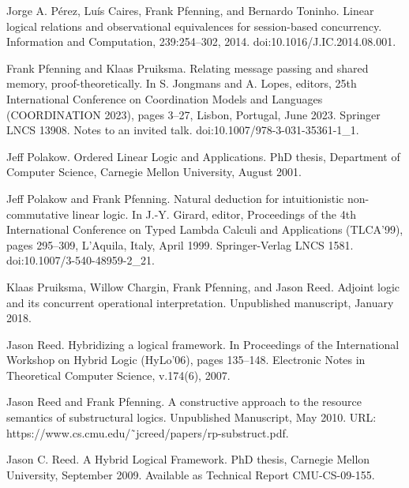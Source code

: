 \par\noindent  [34]  Jorge A. Pérez, Luís Caires, Frank Pfenning, and Bernardo Toninho.  Linear logical relations and observational equivalences for session-based concurrency.  Information and Computation, 239:254–302, 2014.  doi:10.1016/J.IC.2014.08.001.  
 
\par\noindent  [35]  Frank Pfenning and Klaas Pruiksma.  Relating message passing and shared memory, proof-theoretically.  In S. Jongmans and A. Lopes, editors, 25th International Conference on Coordination Models and Languages (COORDINATION 2023), pages 3–27, Lisbon, Portugal, June 2023. Springer LNCS 13908.  Notes to an invited talk.  doi:10.1007/978-3-031-35361-1\_1.  
 
\par\noindent  [36]  Jeff Polakow.  Ordered Linear Logic and Applications.  PhD thesis, Department of Computer Science, Carnegie Mellon University, August 2001.  
 
\par\noindent  [37]  Jeff Polakow and Frank Pfenning.  Natural deduction for intuitionistic non-commutative linear logic.  In J.-Y. Girard, editor, Proceedings of the 4th International Conference on Typed Lambda Calculi and Applications (TLCA’99), pages 295–309, L’Aquila, Italy, April 1999. Springer-Verlag LNCS 1581.  doi:10.1007/3-540-48959-2\_21.  
 
\par\noindent  [38]  Klaas Pruiksma, Willow Chargin, Frank Pfenning, and Jason Reed.  Adjoint logic and its concurrent operational interpretation.  Unpublished manuscript, January 2018.  
 
\par\noindent  [39]  Jason Reed.  Hybridizing a logical framework.  In Proceedings of the International Workshop on Hybrid Logic (HyLo’06), pages 135–148. Electronic Notes in Theoretical Computer Science, v.174(6), 2007.  
 
\par\noindent  [40]  Jason Reed and Frank Pfenning.  A constructive approach to the resource semantics of substructural logics.  Unpublished Manuscript, May 2010.  URL: https://www.cs.cmu.edu/˜jcreed/papers/rp-substruct.pdf.  
 
\par\noindent  [41]  Jason C. Reed.  A Hybrid Logical Framework.  PhD thesis, Carnegie Mellon University, September 2009.  Available as Technical Report CMU-CS-09-155.  
 
